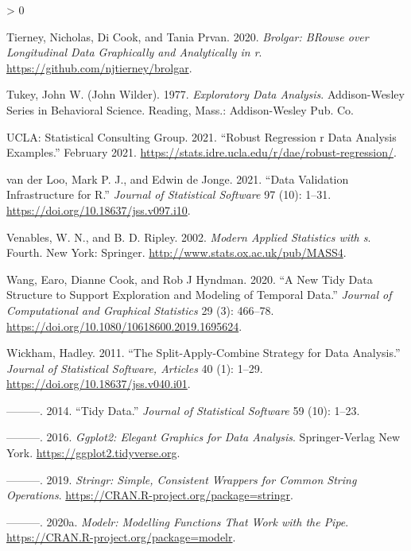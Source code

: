 \documentclass{article}
\newlength{\cslhangindent}
\newenvironment{CSLReferences}[2] %
 {%
  \setlength{\parindent}{0pt}
  \ifodd #1 \everypar{\setlength{\hangindent}{\cslhangindent}}\ignorespaces\fi
  \ifnum #2 > 0
  \setlength{\parskip}{#2\baselineskip}
  \fi
 }%
 {}
\begin{document}
\begin{CSLReferences}{1}{0}
\leavevmode\hypertarget{ref-brolgar}{}%
Tierney, Nicholas, Di Cook, and Tania Prvan. 2020. \emph{Brolgar: BRowse over Longitudinal Data Graphically and Analytically in r}. \url{https://github.com/njtierney/brolgar}.

\leavevmode\hypertarget{ref-tukey}{}%
Tukey, John W. (John Wilder). 1977. \emph{Exploratory Data Analysis}. Addison-Wesley Series in Behavioral Science. Reading, Mass.: Addison-Wesley Pub. Co.

\leavevmode\hypertarget{ref-rlm}{}%
UCLA: Statistical Consulting Group. 2021. {``Robust Regression \textbar{} r Data Analysis Examples.''} February 2021. \url{https://stats.idre.ucla.edu/r/dae/robust-regression/}.

\leavevmode\hypertarget{ref-validate}{}%
van der Loo, Mark P. J., and Edwin de Jonge. 2021. {``Data Validation Infrastructure for {R}.''} \emph{Journal of Statistical Software} 97 (10): 1--31. \url{https://doi.org/10.18637/jss.v097.i10}.

\leavevmode\hypertarget{ref-mass}{}%
Venables, W. N., and B. D. Ripley. 2002. \emph{Modern Applied Statistics with s}. Fourth. New York: Springer. \url{http://www.stats.ox.ac.uk/pub/MASS4}.

\leavevmode\hypertarget{ref-tsibble}{}%
Wang, Earo, Dianne Cook, and Rob J Hyndman. 2020. {``A New Tidy Data Structure to Support Exploration and Modeling of Temporal Data.''} \emph{Journal of Computational and Graphical Statistics} 29 (3): 466--78. \url{https://doi.org/10.1080/10618600.2019.1695624}.

\leavevmode\hypertarget{ref-plyr}{}%
Wickham, Hadley. 2011. {``The Split-Apply-Combine Strategy for Data Analysis.''} \emph{Journal of Statistical Software, Articles} 40 (1): 1--29. \url{https://doi.org/10.18637/jss.v040.i01}.

\leavevmode\hypertarget{ref-WickhamHadley2014TD}{}%
---------. 2014. {``Tidy Data.''} \emph{Journal of Statistical Software} 59 (10): 1--23.

\leavevmode\hypertarget{ref-ggplot2}{}%
---------. 2016. \emph{Ggplot2: Elegant Graphics for Data Analysis}. Springer-Verlag New York. \url{https://ggplot2.tidyverse.org}.

\leavevmode\hypertarget{ref-stringr}{}%
---------. 2019. \emph{Stringr: Simple, Consistent Wrappers for Common String Operations}. \url{https://CRAN.R-project.org/package=stringr}.

\leavevmode\hypertarget{ref-modelr}{}%
---------. 2020a. \emph{Modelr: Modelling Functions That Work with the Pipe}. \url{https://CRAN.R-project.org/package=modelr}.


\end{CSLReferences}
\end{document}
